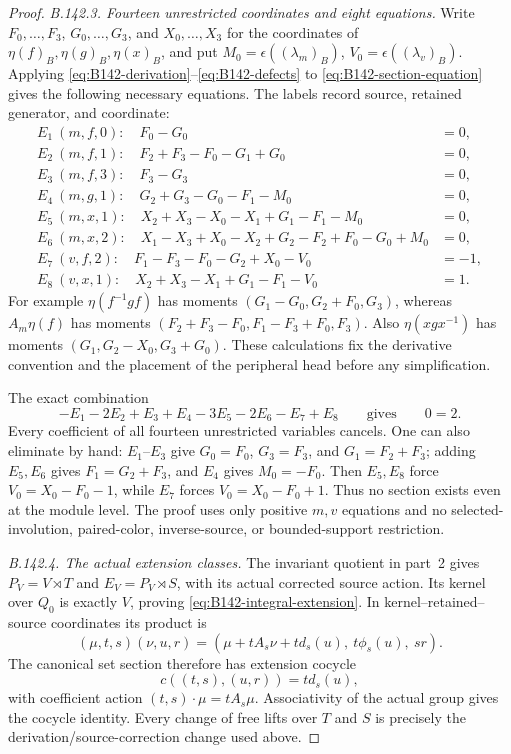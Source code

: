\begin{proof}
\emph{B.142.3. Fourteen unrestricted coordinates and eight equations.}
Write $F_0,\ldots,F_3$, $G_0,\ldots,G_3$, and $X_0,\ldots,X_3$
for the coordinates of $\eta(f)_B,\eta(g)_B,\eta(x)_B$, and put
$M_0=\epsilon((\lambda_m)_B)$,
$V_0=\epsilon((\lambda_v)_B)$.
Applying \eqref{eq:B142-derivation}--\eqref{eq:B142-defects} to
\eqref{eq:B142-section-equation} gives the following necessary equations.
The labels record source, retained generator, and coordinate:
\begin{equation}\label{eq:B142-eight-rows}
 \begin{aligned}
 E_1\ (m,f,0):\quad F_0-G_0&=0,\\
 E_2\ (m,f,1):\quad F_2+F_3-F_0-G_1+G_0&=0,\\
 E_3\ (m,f,3):\quad F_3-G_3&=0,\\
 E_4\ (m,g,1):\quad G_2+G_3-G_0-F_1-M_0&=0,\\
 E_5\ (m,x,1):\quad X_2+X_3-X_0-X_1+G_1-F_1-M_0&=0,\\
 E_6\ (m,x,2):\quad X_1-X_3+X_0-X_2+G_2-F_2+F_0-G_0+M_0&=0,\\
 E_7\ (v,f,2):\quad F_1-F_3-F_0-G_2+X_0-V_0&=-1,\\
 E_8\ (v,x,1):\quad X_2+X_3-X_1+G_1-F_1-V_0&=1.
 \end{aligned}
\end{equation}
For example $\eta(f^{-1}gf)$ has moments
$(G_1-G_0,G_2+F_0,G_3)$, whereas $A_m\eta(f)$ has moments
$(F_2+F_3-F_0,F_1-F_3+F_0,F_3)$. Also
$\eta(xgx^{-1})$ has moments $(G_1,G_2-X_0,G_3+G_0)$.
These calculations fix the derivative convention and the placement
of the peripheral head before any simplification.

The exact combination
\begin{equation}\label{eq:B142-zero-two}
 -E_1-2E_2+E_3+E_4-3E_5-2E_6-E_7+E_8
 \qquad\text{gives}\qquad 0=2.
\end{equation}
Every coefficient of all fourteen unrestricted variables cancels.
One can also eliminate by hand: $E_1$--$E_3$ give
$G_0=F_0$, $G_3=F_3$, and $G_1=F_2+F_3$; adding $E_5,E_6$
gives $F_1=G_2+F_3$, and $E_4$ gives $M_0=-F_0$.
Then $E_5,E_8$ force $V_0=X_0-F_0-1$, while $E_7$ forces
$V_0=X_0-F_0+1$.
Thus no section exists even at the module level. The proof uses only
positive $m,v$ equations and no selected-involution, paired-color,
inverse-source, or bounded-support restriction.

\emph{B.142.4. The actual extension classes.}
The invariant quotient in part~2 gives
$P_V=V\rtimes T$ and $E_V=P_V\rtimes S$, with its actual corrected
source action. Its kernel over $Q_0$ is exactly $V$, proving
\eqref{eq:B142-integral-extension}. In kernel--retained--source
coordinates its product is
\[
 (\mu,t,s)(\nu,u,r)
   =(\mu+tA_s\nu+t d_s(u),\ t\phi_s(u),\ sr).
\]
The canonical set section therefore has extension cocycle
\[
 c((t,s),(u,r))=t d_s(u),
\]
with coefficient action $(t,s)\cdot\mu=tA_s\mu$.
Associativity of the actual group gives the cocycle identity.
Every change of free lifts over $T$ and $S$ is precisely the
derivation/source-correction change used above.


\end{proof}
